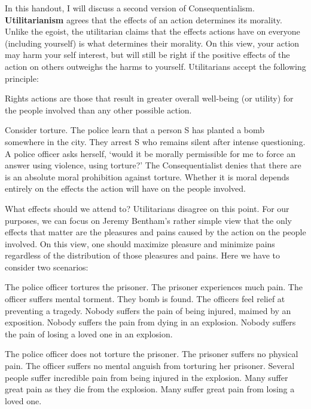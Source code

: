 \documentclass[9pt]{article}
\begin{document}
In this handout, I will discuss a second version of Consequentialism.
\textbf{Utilitarianism} agrees that the effects of an action determines
its morality. Unlike the egoist, the utilitarian claims that the effects
actions have on everyone (including yourself) is what determines their
morality. On this view, your action may harm your self interest, but
will still be right if the positive effects of the action on others
outweighs the harms to yourself. Utilitarians accept the following
principle:

\begin{description}
\itemsep1pt\parskip0pt
\item[The Principle of Utility:]
Rights actions are those that result in greater overall well-being (or
utility) for the people involved than any other possible action.
\end{description}

Consider torture. The police learn that a person S has planted a bomb
somewhere in the city. They arrest S who remains silent after intense
questioning. A police officer asks herself, `would it be morally
permissible for me to force an answer using violence, using torture?'
The Consequentialist denies that there are is an absolute moral
prohibition against torture. Whether it is moral depends entirely on the
effects the action will have on the people involved.

What effects should we attend to? Utilitarians disagree on this point.
For our purposes, we can focus on Jeremy Bentham's rather simple view
that the only effects that matter are the pleasures and pains caused by
the action on the people involved. On this view, one should maximize
pleasure and minimize pains regardless of the distribution of those
pleasures and pains. Here we have to consider two scenarios:

\begin{description}
\itemsep1pt\parskip0pt
\item[Scenario 1:]
The police officer tortures the prisoner. The prisoner experiences much
pain. The officer suffers mental torment. They bomb is found. The
officers feel relief at preventing a tragedy. Nobody suffers the pain of
being injured, maimed by an exposition. Nobody suffers the pain from
dying in an explosion. Nobody suffers the pain of losing a loved one in
an explosion.
\item[Scenario 2:]
The police officer does not torture the prisoner. The prisoner suffers
no physical pain. The officer suffers no mental anguish from torturing
her prisoner. Several people suffer incredible pain from being injured
in the explosion. Many suffer great pain as they die from the explosion.
Many suffer great pain from losing a loved one.
\end{description}
\end{document}
